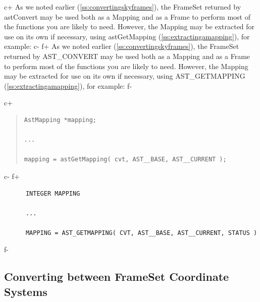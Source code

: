 \documentclass[twoside,11pt]{article}
\newcommand{\secref}[1]{\S\ref{#1}}
\renewcommand{\secref}[1]{\ref{#1}}
\begin{document}
c+
As we noted earlier (\secref{ss:convertingskyframes}), the FrameSet
returned by astConvert may be used both as a Mapping and as a Frame to
perform most of the functions you are likely to need. However, the
Mapping may be extracted for use on its own if necessary, using
astGetMapping (\secref{ss:extractingamapping}), for example:
c-
f+
As we noted earlier (\secref{ss:convertingskyframes}), the FrameSet
returned by AST\_CONVERT may be used both as a Mapping and as a Frame
to perform most of the functions you are likely to need. However, the
Mapping may be extracted for use on its own if necessary, using
AST\_GETMAPPING (\secref{ss:extractingamapping}), for example:
f-

c+
\begin{quote}
\small
\begin{verbatim}
AstMapping *mapping;

...

mapping = astGetMapping( cvt, AST__BASE, AST__CURRENT );
\end{verbatim}
\normalsize
\end{quote}
c-
f+
\small
\begin{verbatim}
      INTEGER MAPPING

      ...

      MAPPING = AST_GETMAPPING( CVT, AST__BASE, AST__CURRENT, STATUS )
\end{verbatim}
\normalsize
f-

\subsection{\label{ss:framesetconverting}Converting between FrameSet Coordinate Systems}
\end{document}
